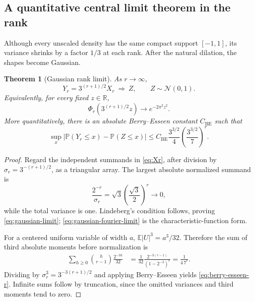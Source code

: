 \documentclass[11pt,a4paper]{article}
\theoremstyle{frontier}
\newtheorem{theorem}{Theorem}[section]
\theoremstyle{definition}
\newcommand{\E}{\mathbb E}
\newcommand{\Pp}{\mathbb P}
\newcommand{\R}{\mathbb R}
\begin{document}
\subsection{A quantitative central limit theorem in the rank}

Although every unscaled density has the same compact support $[-1,1]$, its variance shrinks by a factor $1/3$ at each rank.  After the natural dilation, the shapes become Gaussian.

\begin{theorem}[Gaussian rank limit]\label{thm:gaussian-limit}
As $r\to\infty$,
\begin{equation}\label{eq:gaussian-limit}
  Y_r=3^{(r+1)/2}X_r\ \Longrightarrow\ Z,
  \qquad Z\sim\mathcal N(0,1).
\end{equation}
Equivalently, for every fixed $z\in\R$,
\begin{equation}\label{eq:gaussian-fourier-limit}
  \Phi_r\!\left(3^{(r+1)/2}z\right)
  \longrightarrow e^{-2\pi^2z^2}.
\end{equation}
More quantitatively, there is an absolute Berry--Esseen constant $C_{\mathrm{BE}}$ such that
\begin{equation}\label{eq:berry-esseen-r}
 \sup_x\left|\Pp(Y_r\le x)-\Pp(Z\le x)\right|
 \le C_{\mathrm{BE}}\frac{3^{3/2}}4
 \left(\frac{3^{3/2}}7\right)^r.
\end{equation}
\end{theorem}

\begin{proof}
Regard the independent summands in \eqref{eq:Xr}, after division by
$\sigma_r=3^{-(r+1)/2}$, as a triangular array.  The largest absolute normalized summand is
\[
 \frac{2^{-r}}{\sigma_r}
 =\sqrt3\left(\frac{\sqrt3}{2}\right)^r\longrightarrow0,
\]
while the total variance is one.  Lindeberg's condition follows, proving \eqref{eq:gaussian-limit}; \eqref{eq:gaussian-fourier-limit} is the characteristic-function form.

For a centered uniform variable of width $a$, $\E|U|^3=a^3/32$.  Therefore the sum of third absolute moments before normalization is
\begin{align*}
 \sum_{h\ge0}\binom h{r-1}\frac{2^{-3h}}{32}
 &=\frac1{32}\frac{2^{-3(r-1)}}{(1-2^{-3})^r}
 =\frac1{4\,7^r}.
\end{align*}
Dividing by $\sigma_r^3=3^{-3(r+1)/2}$ and applying Berry--Esseen yields \eqref{eq:berry-esseen-r}.  Infinite sums follow by truncation, since the omitted variances and third moments tend to zero.
\end{proof}
\end{document}
